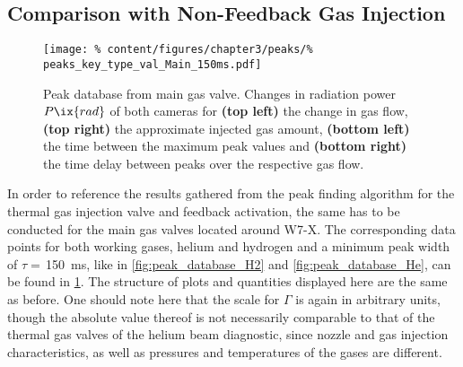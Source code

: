         \subsection{Comparison with Non-Feedback Gas Injection}\label{sec:compmainvalve}%
%
            \begin{figure}[t]%
                \centering%
                \texttt{[image: \%
                    content/figures/chapter3/peaks/\%
                    peaks\_key\_type\_val\_Main\_150ms.pdf]}%
                \caption{Peak database from main gas valve. Changes in radiation power $P\ix{rad}$ of both cameras for \textbf{(top left)} the change in gas flow, \textbf{(top right)} the approximate injected gas amount, \textbf{(bottom left)} the time between the maximum peak values and \textbf{(bottom right)} the time delay between peaks over the respective gas flow.}\label{fig:peak_database_main}%
            \end{figure}%
%
            In order to reference the results gathered from the peak finding algorithm for the thermal gas injection valve and feedback activation, the same has to be conducted for the main gas valves located around W7-X. The corresponding data points for both working gases, helium and hydrogen and a minimum peak width of $\tau=$\,\SI{150}{\milli\second}, like in \cref{fig:peak_database_H2} and \cref{fig:peak_database_He}, can be found in \cref{fig:peak_database_main}. The structure of plots and quantities displayed here are the same as before. One should note here that the scale for $\Gamma$ is again in arbitrary units, though the absolute value thereof is not necessarily comparable to that of the thermal gas valves of the helium beam diagnostic, since nozzle and gas injection characteristics, as well as pressures and temperatures of the gases are different.\\%
